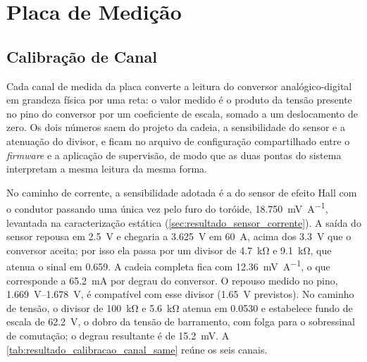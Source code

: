 \section{Placa de Medição}
\label{sec:resultado_validacao_same}
\label{sec:resultado_validacao_siba}

\subsection{Calibração de Canal}
\label{sec:resultado_calibracao_canal_same}

Cada canal de medida da placa converte a leitura do conversor
analógico-digital em grandeza física por uma reta: o valor medido é o produto
da tensão presente no pino do conversor por um coeficiente de escala, somado a
um deslocamento de zero. Os dois números saem do projeto da cadeia, a
sensibilidade do sensor e a atenuação do divisor, e ficam no arquivo de
configuração compartilhado entre o \textit{firmware} e a aplicação de
supervisão, de modo que as duas pontas do sistema interpretam a mesma leitura
da mesma forma.

No caminho de corrente, a sensibilidade adotada é a do sensor de efeito Hall
com o condutor passando uma única vez pelo furo do toróide,
\SI{18,750}{\milli\volt\per\ampere}, levantada na caracterização estática
(\autoref{sec:resultado_sensor_corrente}). A saída do sensor repousa em
\SI{2,5}{\volt} e chegaria a \SI{3,625}{\volt} em \SI{60}{\ampere}, acima dos
\SI{3,3}{\volt} que o conversor aceita; por isso ela passa por um divisor de
\SI{4,7}{\kilo\ohm} e \SI{9,1}{\kilo\ohm}, que atenua o sinal em \num{0,659}. A
cadeia completa fica com \SI{12,36}{\milli\volt\per\ampere}, o que corresponde
a \SI{65,2}{\milli\ampere} por degrau do conversor. O repouso medido no pino,
\SIrange{1,669}{1,678}{\volt}, é compatível com esse divisor
(\SI{1,65}{\volt} previstos). No caminho de tensão, o
divisor de \SI{100}{\kilo\ohm} e \SI{5,6}{\kilo\ohm} atenua em \num{0,0530} e
estabelece fundo de escala de \SI{62,2}{\volt}, o dobro da tensão de
barramento, com folga para o sobressinal de comutação; o degrau resultante é
de \SI{15,2}{\milli\volt}. A \autoref{tab:resultado_calibracao_canal_same}
reúne os seis canais.

